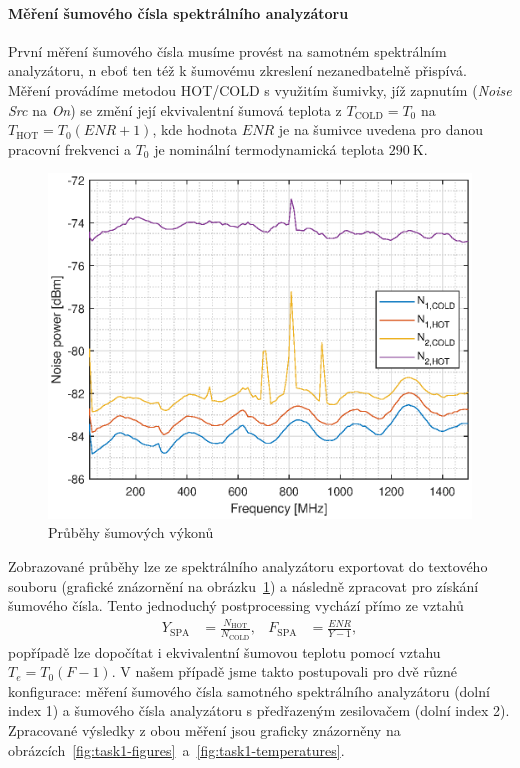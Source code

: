 \documentclass[11pt,a4paper]{article}
\begin{document}
\paragraph*{Měření šumového čísla spektrálního analyzátoru} První měření šumového čísla musíme provést na samotném spektrálním analyzátoru, n   eboť ten též k šumovému zkreslení nezanedbatelně přispívá. Měření provádíme metodou HOT/COLD s využitím šumivky, jíž zapnutím (\emph{Noise Src} na \emph{On}) se změní její ekvivalentní šumová teplota z $T_{\mathrm{COLD}} = T_0$ na $T_{\mathrm{HOT}} = T_0(\mathit{ENR} + 1)$, kde hodnota $\mathit{ENR}$ je na šumivce uvedena pro danou pracovní frekvenci a $T_0$ je nominální termodynamická teplota $290 \ \mathrm K$.

\begin{figure}[!ht]
    \centering
    \includegraphics[width=.65\textwidth]{src/task1_powers.eps}
    \caption{Průběhy šumových výkonů}
    \label{fig:task1-powers}
\end{figure}
Zobrazované průběhy lze ze spektrálního analyzátoru exportovat do textového souboru (grafické znázornění na obrázku~\ref{fig:task1-powers}) a následně zpracovat pro získání šumového čísla. Tento jednoduchý postprocessing vychází přímo ze vztahů
\begin{align}
    Y_{\mathrm{SPA}} &= \frac{N_{\mathrm{HOT}}}{N_{\mathrm{COLD}}},
&
    F_{\mathrm{SPA}} &= \frac{\mathit{ENR}}{Y-1},
\end{align}
popřípadě lze dopočítat i ekvivalentní šumovou teplotu pomocí vztahu $T_e = T_0(F-1)$. V našem případě jsme takto postupovali pro dvě různé konfigurace: měření šumového čísla samotného spektrálního analyzátoru (dolní index 1) a šumového čísla analyzátoru s předřazeným zesilovačem (dolní index 2). Zpracované výsledky z obou měření jsou graficky znázorněny na obrázcích~\ref{fig:task1-figures}~a~\ref{fig:task1-temperatures}.
\end{document}
